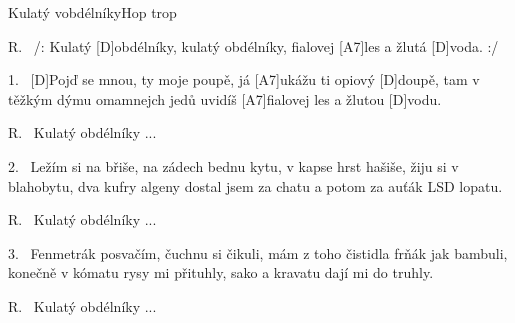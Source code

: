 \begin{song}{Kulatý vobdélníky}{Hop trop}

\begin{xverse}{R.~}
/: Kulatý [\large D]obdélníky, kulatý obdélníky,
fialovej [\large A7]les a žlutá [\large D]voda. :/
\end{xverse}

\begin{xverse}{1.~}
[\large D]Pojď se mnou, ty moje poupě,
já [\large A7]ukážu ti opiový [\large D]doupě,
tam v těžkým dýmu omamnejch jedů
uvidíš [\large A7]fialovej les a žlutou [\large D]vodu.
\end{xverse}

\begin{xverse}{R.~}
Kulatý obdélníky ...
\end{xverse}

\begin{xverse}{2.~}
Ležím si na břiše, na zádech bednu kytu,
v kapse hrst hašiše, žiju si v blahobytu,
dva kufry algeny dostal jsem za chatu
a potom za auťák LSD lopatu.
\end{xverse}

\begin{xverse}{R.~}
Kulatý obdélníky ...
\end{xverse}

\begin{xverse}{3.~}
Fenmetrák posvačím, čuchnu si čikuli,
mám z toho čistidla frňák jak bambuli,
konečně v kómatu rysy mi přituhly,
sako a kravatu dají mi do truhly.
\end{xverse}

\begin{xverse}{R.~}
Kulatý obdélníky ...
\end{xverse}

\end{song}

